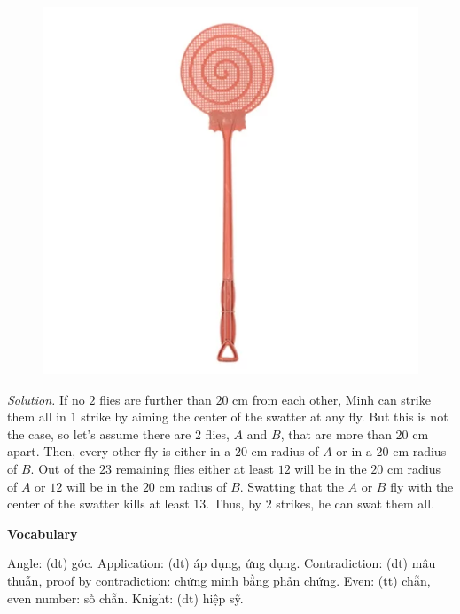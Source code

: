 \begin{multicols}{2}
	\vskip 0.2cm
	\begin{figure}[H]
		\vspace*{-5pt}
		\centering
		\captionsetup{labelformat= empty, justification=centering}
		\includegraphics[width= 0.85\linewidth]{vr}
		\vspace*{-10pt}
	\end{figure}
	\textit{Solution.}
	If no $2$ flies are further than $20$ cm from each other,
	Minh can strike them all in $1$ strike by aiming the center of the swatter at any fly. 
	But this is not the case, so let’s assume there are $2$ flies, $A$ and $B$, that are more than $20$ cm apart.
	Then, every other fly is either in a $20$ cm radius of $A$ or in a $20$ cm radius of $B.$
	Out of the $23$ remaining flies either at least $12$ will be in the $20$ cm radius of $A$
	or $12$ will be in the $20$ cm radius of $B$.
	Swatting that the $A$ or $B$ fly with the center of the swatter kills at least $13$.
	\vskip 0.1cm
	Thus, by $2$ strikes, he can swat them all.
	\begin{center}
		\textbf{\color{toancuabi}Vocabulary}
	\end{center}
	{\color{toancuabi}Angle}: (dt) góc.
	\vskip 0.1cm
	{\color{toancuabi}Application}: (dt)  áp dụng, ứng dụng.
	\vskip 0.1cm
	{\color{toancuabi}Contradiction}: (dt) mâu thuẫn, {\color{toancuabi}proof by contradiction}: chứng minh bằng phản chứng.
	\vskip 0.1cm
	{\color{toancuabi}Even}: (tt) chẵn, {\color{toancuabi}even number}: số chẵn.
	\vskip 0.1cm
	{\color{toancuabi}Knight}: (dt) hiệp sỹ.

\end{multicols}
